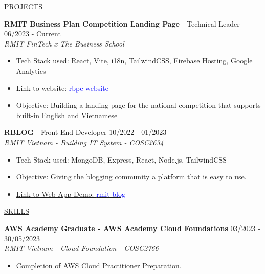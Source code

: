 \documentclass[11pt]{article}
\newcommand{\betteruline}[1]{
    \uline{#1}
}
\newcommand{\sectiontitle}[1]{
    \begingroup
        \titlebold
        \betteruline{\Large\uppercase{#1}  }
        \vspace{1.7mm}
    \endgroup
}
\newcommand{\sectioncontent}[1]{
    \begingroup
        \begin{FlushLeft}
        \vspace{-3mm}
        \sffamily\small#1
        \end{FlushLeft}
    \endgroup
    \vspace{2mm}
}
\newcommand{\job}[3]{
    \begingroup
        \textbf{\small#1} - \small#2
        \hfill\color{black!70}\small{#3}
    \endgroup
}
\newcommand{\project}[2]{
    \begingroup
        \textbf{\small#1}
        \hfill\color{black!70}\small{#2}
    \endgroup
}
\newcommand{\spacevv}{
    \vspace{2mm}
}
\begin{document}
\begin{paracol}{2}
    \sectiontitle{Projects}
    \sectioncontent{
    \job{RMIT Business Plan Competition Landing Page}{Technical Leader}{06/2023 - Current} \\
      \textcolor{black!70}{\textit{RMIT FinTech x The Business School}}
\vspace{1mm}
      \begin{itemize}
        \item Tech Stack used: React, Vite, i18n, TailwindCSS, Firebase Hosting, Google Analytics
        \item  \href{https://rbpc-website.web.app/}{Link to website: \textcolor{blue}{rbpc-website}}
\vspace{1mm}
        \item Objective: Building a landing page for the national competition that supports built-in English and Vietnamese
      \end{itemize}
      \spacevv
\vspace{2mm}
    \job{RBLOG}{Front End Developer}{10/2022 - 01/2023} \\
      \textcolor{black!70}{\textit{RMIT Vietnam - Building IT System - COSC2634}}
\vspace{1mm}
      \begin{itemize}
        \item Tech Stack used: MongoDB, Express, React, Node.js, TailwindCSS
\vspace{1mm}
        \item Objective: Giving the blogging community a platform that is easy to use.
\vspace{1mm}
        \item  \href{https://rmit-blog.netlify.app/}{Link to Web App Demo: \textcolor{blue}{rmit-blog}}
      \end{itemize}
      \spacevv
\vspace{2mm}
    }


    \sectiontitle{Skills}
    \sectioncontent{
    \vspace{1mm}
        \project{\href{https://www.credly.com/badges/20c053cd-785a-4100-bc79-bd1c902d5c28/public_url}{AWS Academy Graduate - AWS Academy Cloud Foundations}}{03/2023 - 30/05/2023} \\
    \vspace{1mm}
        \textcolor{black!70}{\textit{RMIT Vietnam - Cloud Foundation - COSC2766}}
        \vspace{1mm}
        \begin{itemize}
            \item  Completion of AWS Cloud Practitioner Preparation.
            \vspace{1mm} 
        \end{itemize}
        \spacevv

}
\end{paracol}
\end{document}
